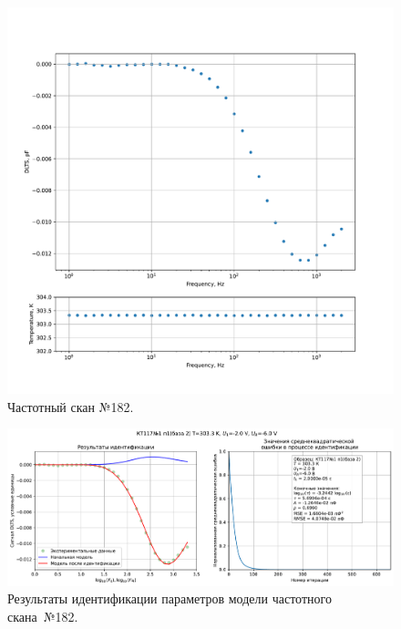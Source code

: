 \begin{figure}[!ht]
    \centering
    \includegraphics[width=1\textwidth]{../plots/КТ117№1_п1(база 2)_2500Гц-1Гц_1пФ_+30С_-2В-6В_200мВ_20мкс_шаг_0,1.pdf}
    \caption{Частотный скан №182.}
    \label{pic:frequency_scan_182}
\end{figure}

\begin{figure}[!ht]
    \centering
    \includegraphics[width=1\textwidth]{../plots/КТ117№1_п1(база 2)_2500Гц-1Гц_1пФ_+30С_-2В-6В_200мВ_20мкс_шаг_0,1_model.pdf}
    \caption{Результаты идентификации параметров модели частотного скана~№182.}
    \label{pic:frequency_scan_model182}
\end{figure}

\pagebreak


